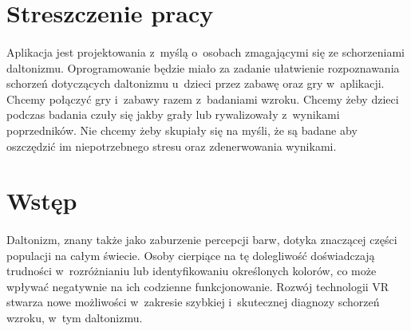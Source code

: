 \documentclass[12pt, letterpaper]{article}
\begin{document}
\setlength{\parindent}{1cm}
\newpage

\section{Streszczenie pracy}
\paragraph{}
Aplikacja jest projektowania z~myślą o~osobach zmagającymi się ze schorzeniami daltonizmu. Oprogramowanie będzie miało za zadanie ułatwienie rozpoznawania schorzeń dotyczących daltonizmu u~dzieci przez zabawę oraz gry w~aplikacji. Chcemy połączyć gry i~zabawy razem z~badaniami wzroku. Chcemy żeby dzieci podczas badania czuły się jakby grały lub rywalizowały z~wynikami poprzedników. Nie chcemy żeby skupiały się na myśli, że są badane aby oszczędzić im niepotrzebnego stresu oraz zdenerwowania wynikami.

\newpage
\tableofcontents

\newpage

\section{Wstęp}
\paragraph{}
Daltonizm, znany także jako zaburzenie percepcji barw, dotyka znaczącej części populacji na całym świecie. Osoby cierpiące na tę dolegliwość doświadczają trudności w~rozróżnianiu lub identyfikowaniu określonych kolorów, co może wpływać negatywnie na ich codzienne funkcjonowanie. Rozwój technologii VR stwarza nowe możliwości w~zakresie szybkiej i~skutecznej diagnozy schorzeń wzroku, w~tym daltonizmu. 
\end{document}
